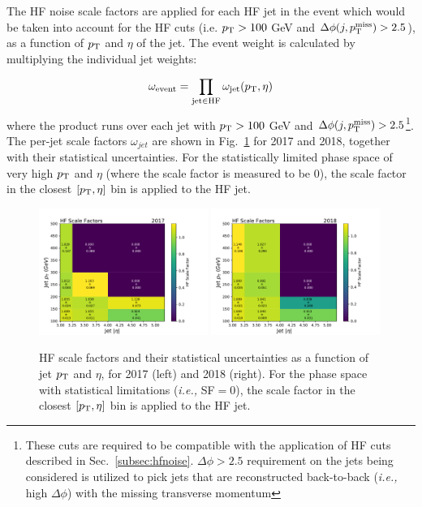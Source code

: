 The HF noise scale factors are applied for each HF jet in the event which would be taken into account for the HF cuts (i.e. $p_{\textrm{T}} > 100$ GeV 
and $\Delta\phi(j,p_{\textrm{T}}^{\textrm{miss}}) > 2.5$), as a function of $p_{\textrm{T}}$ and $\eta$ of the jet. The event weight is calculated by multiplying the individual jet weights:

\begin{equation}
    \omega_{\textrm{event}} = \prod_{\textrm{jet} \in \textrm{HF}} \omega_{\textrm{jet}} (p_{\textrm{T}}, \eta)
\end{equation}
where the product runs over each jet with $p_{\textrm{T}} > 100$ GeV and $\Delta\phi(j,p_{\textrm{T}}^{\textrm{miss}}) > 2.5$\footnote{These cuts are required
to be compatible with the application of HF cuts described in Sec.~\ref{subsec:hfnoise}. $\Delta\phi > 2.5$ requirement on
the jets being considered is utilized to pick jets that are reconstructed back-to-back (\textit{i.e.,} high $\Delta\phi$) with the missing
transverse momentum}.
The per-jet scale factors $\omega_{jet}$ are shown in Fig.~\ref{fig:hf_scale_factors} for 2017 and 2018, together with their statistical uncertainties. 
For the statistically limited phase space of very high $p_{\textrm{T}}$ and $\eta$ (where the scale factor is measured to be $0$), 
the scale factor in the closest $[ p_{\textrm{T}}, \eta ]$ bin is applied to the HF jet.

\begin{figure}[ht!]
    \begin{center}
        \includegraphics[width=0.49\textwidth]{ScaleFactors/HFCuts/hf_sf_2017.pdf}
        \includegraphics[width=0.49\textwidth]{ScaleFactors/HFCuts/hf_sf_2018.pdf}
        \caption{
            HF scale factors and their statistical uncertainties as a function of jet $p_{\textrm{T}}$ and $\eta$, for 2017 (left) and 2018 (right). 
            For the phase space with statistical limitations (\textit{i.e.,} SF$=0$), the scale factor in the closest $[ p_{\textrm{T}}, \eta ]$ bin is applied to the HF jet.
          }
        \label{fig:hf_scale_factors}
    \end{center}
\end{figure}

